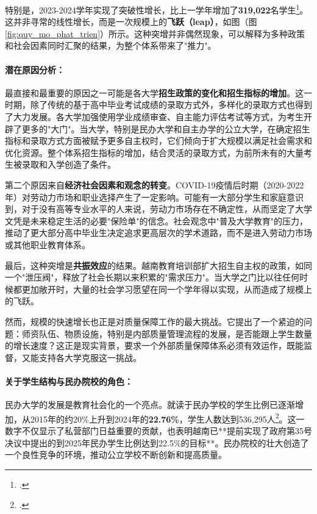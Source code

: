 特别是，2023-2024学年实现了突破性增长，比上一学年增加了\textbf{319,022}名学生\footcite{stat_moet_2024}。这并非寻常的线性增长，而是一次规模上的\textbf{飞跃（leap）}，如图（图\ref{fig:quy_mo_phat_trien}）所示。这种突增并非偶然现象，可以解释为多种政策和社会因素同时汇聚的结果，为整个体系带来了"推力"。

\paragraph{潜在原因分析：}
最直接和最重要的原因之一可能是各大学\textbf{招生政策的变化和招生指标的增加}。这一时期，除了传统的基于高中毕业考试成绩的录取方式外，多样化的录取方式也得到了大力发展。各大学加强使用学业成绩审查、自主能力评估考试等方式，为考生开辟了更多的"大门"。当大学，特别是民办大学和自主办学的公立大学，在确定招生指标和录取方式方面被赋予更多自主权时，它们倾向于扩大规模以满足社会需求和优化资源。整个体系招生指标的增加，结合灵活的录取方式，为前所未有的大量考生被录取和入学创造了条件。

第二个原因来自\textbf{经济社会因素和观念的转变}。COVID-19疫情后时期（2020-2022年）对劳动力市场和职业选择产生了一定影响。可能有一大部分学生和家庭意识到，对于没有高等专业水平的人来说，劳动力市场存在不确定性，从而坚定了大学文凭是未来稳定生活的必要"保险单"的信念。社会观念中"普及大学教育"的压力，推动了更大部分高中毕业生决定追求更高层次的学术道路，而不是进入劳动力市场或其他职业教育体系。

最后，这种突增是\textbf{共振效应}的结果。越南教育培训部扩大招生自主权的政策，如同一个"泄压阀"，释放了社会长期以来积累的"需求压力"。当大学之门比以往任何时候都更加敞开时，大量的社会学习愿望在同一个学年得以实现，从而造成了规模上的飞跃。

然而，规模的快速增长也正是对质量保障工作的最大挑战。它提出了一个紧迫的问题：师资队伍、物质设施，特别是内部质量管理流程的发展，是否能跟上学生数量的增长速度？这正是现实背景，要求一个外部质量保障体系必须有效运作，既能监督，又能支持各大学克服这一挑战。

\paragraph{关于学生结构与民办院校的角色：}
民办大学的发展是教育社会化的一个亮点。就读于民办学校的学生比例已逐渐增加，从2015年的约20\%上升到2024年的\textbf{22.76\%}，学生人数达到536,295人\footcite{stat_moet_2024}。这一数字不仅显示了私营部门日益重要的贡献，也表明越南已**提前实现了政府第35号决议中提出的到2025年民办学生比例达到22.5\%的目标**。民办院校的壮大创造了一个良性竞争的环境，推动公立学校不断创新和提高质量。

